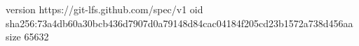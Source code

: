 version https://git-lfs.github.com/spec/v1
oid sha256:73a4db60a30bcb436d7907d0a79148d84cac04184f205cd23b1572a738d456aa
size 65632
